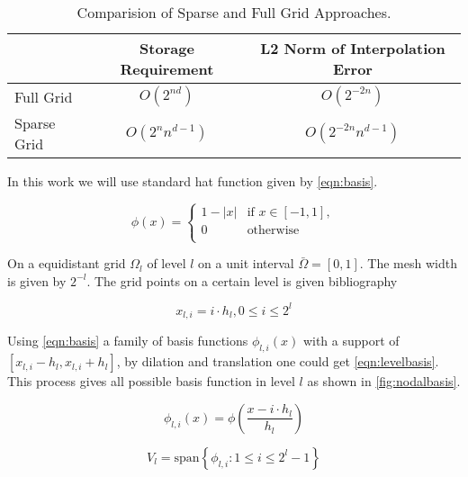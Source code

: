 \begin{table}[hbpt]
    \centering
    \caption{Comparision of Sparse and Full Grid Approaches.}
    \begin{tabular}{l c c}
        \multicolumn{1}{c}{} & Storage Requirement  & \multicolumn{1}{c}{L2 Norm of Interpolation Error} \\
        \toprule
        Full Grid            & \(O(2^{nd})\)        & \(O(2^{-2n})\)                                     \\
        \midrule
        Sparse Grid          & \(O(2^{n} n^{d-1})\) & \(O(2^{-2n} n^{d-1})\)                             \\
        \bottomrule
    \end{tabular}
    \label{tab:comparisionfull}
\end{table}

In this work we will use standard hat function given by \cref{eqn:basis}.

\begin{equation}
    \phi(x ) = \left\{
    \begin{array}{ll}
        1-|x| & \text{if } x \in [-1,1] , \\
        0     & \text{otherwise}          \\
    \end{array}
    \right.
    \label{eqn:basis}
\end{equation}

On a equidistant grid \(\Omega_l \) of level \( l\) on a unit interval \(\bar{\Omega} = [0,1]\). The mesh width is given by \(2^{-l} \). The grid points on a certain level is given bibliography

\begin{equation}
    x_{l,i} = i \cdot h_l, 0 \leq i \leq 2^l
\end{equation}

Using \cref{eqn:basis} a family of basis functions \(\phi_{l,i}(x)\) with a support of \([x_{l,i}-h_l,x_{l,i}+h_l]\), by dilation and translation one could get \cref{eqn:levelbasis}. This process gives all possible basis function in level \(l\) as shown in \cref{fig:nodalbasis}.

\begin{equation}
    \phi_{l,i}(x) = \phi \left(\frac{x-i\cdot h_l}{h_l}\right)
\end{equation}

\begin{equation}
    V_l = \text{span} \left\{ \phi_{l,i} : 1 \leq i \leq 2^l-1 \right\}
    \label{eqn:levelbasis}
\end{equation}

